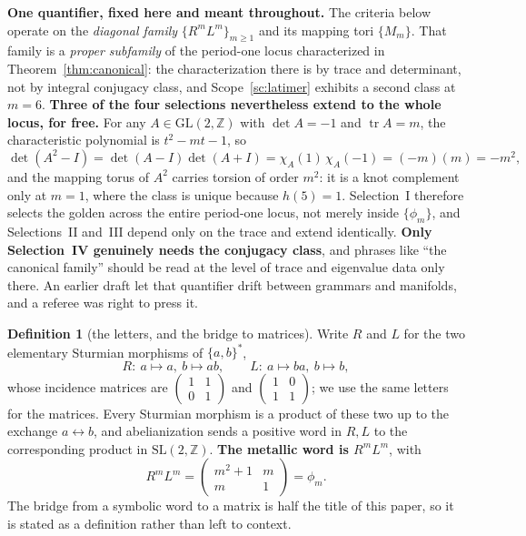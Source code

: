 \documentclass[11pt,reqno]{amsart}
\theoremstyle{plain}
\theoremstyle{definition}
\newtheorem{definition}[theorem]{Definition}
\theoremstyle{remark}
\newcommand{\Z}{\mathbb{Z}}
\newcommand{\SL}{\mathrm{SL}}
\newcommand{\GL}{\mathrm{GL}}
\newcommand{\tr}{\operatorname{tr}}
\begin{document}
\textbf{One quantifier, fixed here and meant throughout.} The criteria below operate on the
\emph{diagonal family} $\{R^mL^m\}_{m\ge1}$ and its mapping tori $\{M_m\}$. That family is a
\emph{proper subfamily} of the period-one locus characterized in Theorem~\ref{thm:canonical}:
the characterization there is by trace and determinant, not by integral conjugacy class,
and Scope~\ref{sc:latimer} exhibits a second class at $m=6$. \textbf{Three of the four selections nevertheless extend to the whole locus, for
free.} For any $A\in\GL(2,\Z)$ with $\det A=-1$ and $\tr A=m$, the characteristic
polynomial is $t^2-mt-1$, so
\[
   \det(A^2-I)=\det(A-I)\det(A+I)=\chi_A(1)\,\chi_A(-1)=(-m)(m)=-m^2 ,
\]
and the mapping torus of $A^2$ carries torsion of order $m^2$: it is a knot complement
only at $m=1$, where the class is unique because $h(5)=1$. Selection~I therefore selects
the golden across the entire period-one locus, not merely inside $\{\phi_m\}$, and
Selections~II and~III depend only on the trace and extend identically. \textbf{Only
Selection~IV genuinely needs the conjugacy class}, and phrases like ``the canonical
family'' should be read at the level of trace and eigenvalue data only there. An earlier draft let that quantifier drift between grammars and
manifolds, and a referee was right to press it.

\begin{definition}[the letters, and the bridge to matrices]\label{def:RL}
Write $R$ and $L$ for the two elementary Sturmian morphisms of $\{a,b\}^*$,
\[
   R:\ a\mapsto a,\ b\mapsto ab,\qquad
   L:\ a\mapsto ba,\ b\mapsto b,
\]
whose incidence matrices are
$\left(\begin{smallmatrix}1&1\\0&1\end{smallmatrix}\right)$ and
$\left(\begin{smallmatrix}1&0\\1&1\end{smallmatrix}\right)$; we use the same letters for
the matrices. Every Sturmian morphism is a product of these two up to the exchange
$a\leftrightarrow b$, and abelianization sends a positive word in $R,L$ to the
corresponding product in $\SL(2,\Z)$. \textbf{The metallic word is $R^mL^m$}, with
\[
   R^mL^m=\begin{pmatrix}m^2+1&m\\m&1\end{pmatrix}=\phi_m .
\]
The bridge from a symbolic word to a matrix is half the title of this paper, so it is
stated as a definition rather than left to context.
\end{definition}
\end{document}

